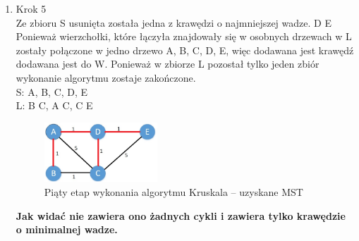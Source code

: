 \begin{enumerate}
\item Krok 5\\
Ze zbioru S usunięta została jedna z krawędzi o najmniejszej wadze. {D E} Ponieważ wierzchołki, które łączyła znajdowały się w osobnych drzewach w L zostały połączone w jedno drzewo {A, B, C, D, E}, więc dodawana jest krawędź dodawana jest do W. Ponieważ w zbiorze L pozostał tylko jeden zbiór wykonanie algorytmu zostaje zakończone.\\
S: {A, B, C, D, E}
\\
L: {B C}, {A C}, {C E}
\\
\begin{figure}[htb!]
	\centering
	\includegraphics[width=0.4\textwidth]{tex/fig/Picture6}
	\caption{Piąty etap wykonania algorytmu Kruskala – uzyskane MST}
	\label{fig: legendK5}
\end{figure}

\textbf{Jak widać nie zawiera ono żadnych cykli i zawiera tylko krawędzie o minimalnej wadze.}\\
\end{enumerate}


